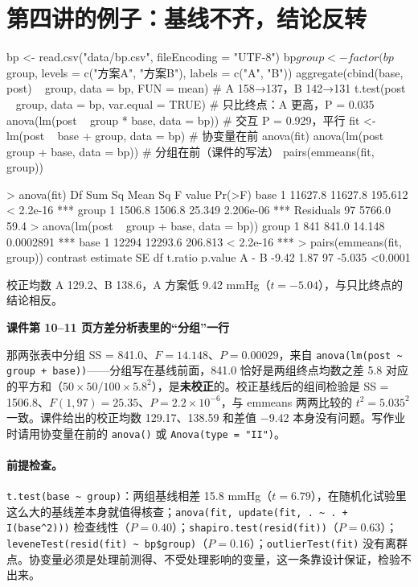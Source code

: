 \section{第四讲的例子：基线不齐，结论反转}
\label{sec:bp}
\begin{rcode}[R · bp.csv]
bp <- read.csv("data/bp.csv", fileEncoding = "UTF-8")
bp$group <- factor(bp$group, levels = c("方案A", "方案B"), labels = c("A", "B"))
aggregate(cbind(base, post) ~ group, data = bp, FUN = mean)   # A 158→137，B 142→131
t.test(post ~ group, data = bp, var.equal = TRUE)             # 只比终点：A 更高，P = 0.035
anova(lm(post ~ group * base, data = bp))                     # 交互 P = 0.929，平行
fit <- lm(post ~ base + group, data = bp)                     # 协变量在前
anova(fit)
anova(lm(post ~ group + base, data = bp))                     # 分组在前（课件的写法）
pairs(emmeans(fit, ~ group))
\end{rcode}
\begin{routput}
> anova(fit)
          Df  Sum Sq Mean Sq F value    Pr(>F)
base       1 11627.8 11627.8 195.612 < 2.2e-16 ***
group      1  1506.8  1506.8  25.349 2.206e-06 ***
Residuals 97  5766.0    59.4
> anova(lm(post ~ group + base, data = bp))
group      1    841   841.0  14.148 0.0002891 ***
base       1  12294 12293.6 206.813 < 2.2e-16 ***
> pairs(emmeans(fit, ~ group))
 contrast estimate   SE df t.ratio p.value
 A - B       -9.42 1.87 97  -5.035 <0.0001
\end{routput}
校正均数 A 129.2、B 138.6，A 方案低 9.42 mmHg（$t=-5.04$），与只比终点的结论相反。


\begin{studyexplain}
\textbf{课件第 10–11 页方差分析表里的“分组”一行}


那两张表中分组 SS = 841.0、$F=14.148$、$P=0.00029$，来自 \Verb|anova(lm(post ~ group + base))|——分组写在基线前面，841.0 恰好是两组终点均数之差 5.8 对应的平方和（$50\times50/100\times5.8^2$），是\textbf{未校正}的。校正基线后的组间检验是 SS = 1506.8、$F(1,97)=25.35$、$P=2.2\times10^{-6}$，与 emmeans 两两比较的 $t^2=5.035^2$ 一致。课件给出的校正均数 129.17、138.59 和差值 −9.42 本身没有问题。写作业时请用协变量在前的 \Verb|anova()| 或 \Verb|Anova(type = "II")|。

\end{studyexplain}


\paragraph{前提检查。}\Verb|t.test(base ~ group)|：两组基线相差 15.8 mmHg（$t=6.79$），在随机化试验里这么大的基线差本身就值得核查；\Verb|anova(fit, update(fit, . ~ . + I(base^2)))| 检查线性（$P=0.40$）；\Verb|shapiro.test(resid(fit))|（$P=0.63$）；\Verb|leveneTest(resid(fit) ~ bp$group)|（$P=0.16$）；\Verb|outlierTest(fit)| 没有离群点。协变量必须是处理前测得、不受处理影响的变量，这一条靠设计保证，检验不出来。

